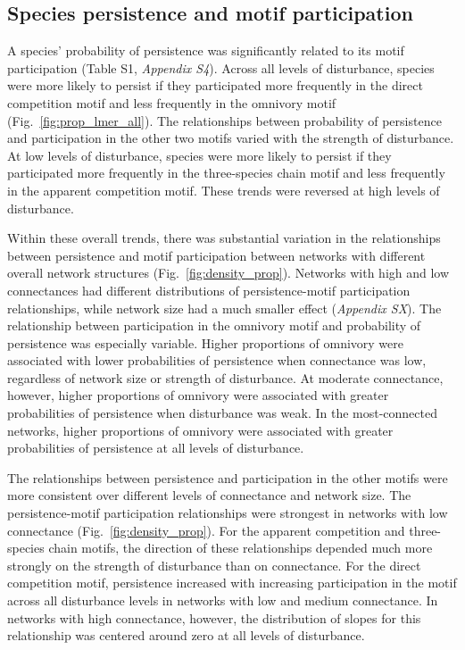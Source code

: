 \documentclass[12pt]{article}
\begin{document}
\begin{spacing}{2.0}
    \subsection*{Species persistence and motif participation} 

        A species' probability of persistence was significantly related to its motif participation (Table S1, \emph{Appendix S4}).
        Across all levels of disturbance, species were more likely to persist if they participated more frequently in the direct competition motif and less frequently in the omnivory motif (Fig.~\ref{fig:prop_lmer_all}).
        The relationships between probability of persistence and participation in the other two motifs varied with the strength of disturbance.
        At low levels of disturbance, species were more likely to persist if they participated more frequently in the three-species chain motif and less frequently in the apparent competition motif.
        These trends were reversed at high levels of disturbance.
    

        Within these overall trends, there was substantial variation in the relationships between persistence and motif participation between networks with different overall network structures (Fig.~\ref{fig:density_prop}).
        Networks with high and low connectances had different distributions of persistence-motif participation relationships, while network size had a much smaller effect (\emph{Appendix SX}).
        The relationship between participation in the omnivory motif and probability of persistence was especially variable.
        Higher proportions of omnivory were associated with lower probabilities of persistence when connectance was low, regardless of network size or strength of disturbance.
        At moderate connectance, however, higher proportions of omnivory were associated with greater probabilities of persistence when disturbance was weak.
        In the most-connected networks, higher proportions of omnivory were associated with greater probabilities of persistence at all levels of disturbance.

        The relationships between persistence and participation in the other motifs were more consistent over different levels of connectance and network size.
        The persistence-motif participation relationships were strongest in networks with low connectance (Fig.~\ref{fig:density_prop}).
        For the apparent competition and three-species chain motifs, the direction of these relationships depended much more strongly on the strength of disturbance than on connectance.
        For the direct competition motif, persistence increased with increasing participation in the motif across all disturbance levels in networks with low and medium connectance.
        In networks with high connectance, however, the distribution of slopes for this relationship was centered around zero at all levels of disturbance.



\end{spacing}
\end{document}
